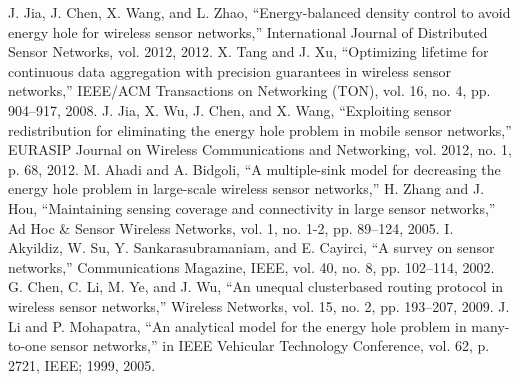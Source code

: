 \documentclass{article}
\begin{document}
\begin{thebibliography}{00}

 J. Jia, J. Chen, X. Wang, and L. Zhao, “Energy-balanced
density control to avoid energy hole for wireless sensor
networks,” International Journal of Distributed Sensor
Networks, vol. 2012, 2012.
 X. Tang and J. Xu, “Optimizing lifetime for continuous
data aggregation with precision guarantees in wireless
sensor networks,” IEEE/ACM Transactions on Networking
(TON), vol. 16, no. 4, pp. 904–917, 2008.
 J. Jia, X. Wu, J. Chen, and X. Wang, “Exploiting sensor
redistribution for eliminating the energy hole problem in
mobile sensor networks,” EURASIP Journal on Wireless
Communications and Networking, vol. 2012, no. 1, p. 68,
2012.
 M. Ahadi and A. Bidgoli, “A multiple-sink model for decreasing
the energy hole problem in large-scale wireless
sensor networks,”
 H. Zhang and J. Hou, “Maintaining sensing coverage and
connectivity in large sensor networks,” Ad Hoc \& Sensor
Wireless Networks, vol. 1, no. 1-2, pp. 89–124, 2005.
 I. Akyildiz, W. Su, Y. Sankarasubramaniam, and
E. Cayirci, “A survey on sensor networks,” Communications
Magazine, IEEE, vol. 40, no. 8, pp. 102–114, 2002.
 G. Chen, C. Li, M. Ye, and J. Wu, “An unequal clusterbased
routing protocol in wireless sensor networks,”
Wireless Networks, vol. 15, no. 2, pp. 193–207, 2009.
 J. Li and P. Mohapatra, “An analytical model for the energy
hole problem in many-to-one sensor networks,” in
IEEE Vehicular Technology Conference, vol. 62, p. 2721,
IEEE; 1999, 2005.
\end{thebibliography}
\end{document}
